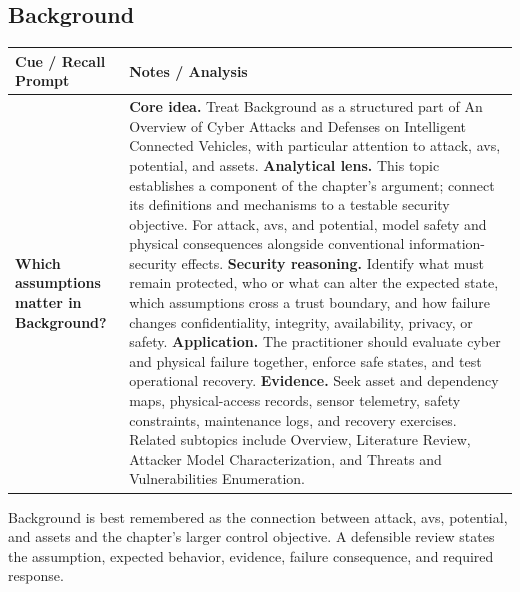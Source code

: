 \documentclass[11pt]{article}
\newcommand{\CornellHeader}{%
\rowcolor{Navy}\color{white}\bfseries Cue / Recall Prompt & \color{white}\bfseries Notes / Analysis\\\hline}
\newcommand{\CornellRow}[2]{%
\cellcolor{CueGray}\RaggedRight\textbf{#1} & \RaggedRight #2\\\hline}
\begin{document}
\subsection*{Background}
\begin{longtable}{>{\RaggedRight\arraybackslash}p{}|>{\RaggedRight\arraybackslash}p{}}
\CornellHeader
\CornellRow{Which assumptions matter in Background?}{\textbf{Core idea.} Treat Background as a structured part of An Overview of Cyber Attacks and Defenses on Intelligent Connected Vehicles, with particular attention to attack, avs, potential, and assets. \textbf{Analytical lens.} This topic establishes a component of the chapter's argument; connect its definitions and mechanisms to a testable security objective. For attack, avs, and potential, model safety and physical consequences alongside conventional information-security effects. \textbf{Security reasoning.} Identify what must remain protected, who or what can alter the expected state, which assumptions cross a trust boundary, and how failure changes confidentiality, integrity, availability, privacy, or safety. \textbf{Application.} The practitioner should evaluate cyber and physical failure together, enforce safe states, and test operational recovery. \textbf{Evidence.} Seek asset and dependency maps, physical-access records, sensor telemetry, safety constraints, maintenance logs, and recovery exercises. Related subtopics include Overview, Literature Review, Attacker Model Characterization, and Threats and Vulnerabilities Enumeration.}
\end{longtable}
\begin{topicsummary}
Background is best remembered as the connection between attack, avs, potential, and assets and the chapter's larger control objective. A defensible review states the assumption, expected behavior, evidence, failure consequence, and required response.
\end{topicsummary}
\end{document}
